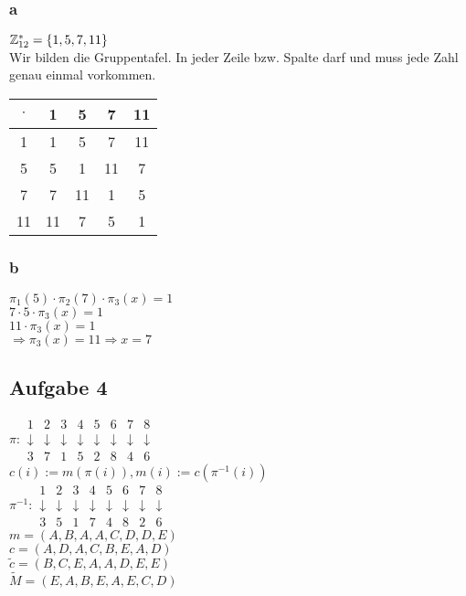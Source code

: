 \subsubsection{a}
$\mathbb{Z}_{12}^* =\{1,5,7,11\}$\\ 
Wir bilden die Gruppentafel. In jeder Zeile bzw. Spalte darf und muss jede Zahl genau einmal vorkommen. 
\begin{tabular}{|c|c|c|c|c|}
\hline $\cdot$ & 1 & 5 & 7 & 11 \\ 
\hline 1 & 1 & 5 & 7 & 11 \\ 
\hline 5 & 5 & 1 & 11 & 7 \\ 
\hline 7 & 7 & 11 & 1 & 5 \\ 
\hline 11 & 11 & 7 & 5 & 1 \\ 
\hline 
\end{tabular} 

\subsubsection{b}
$\pi_1(5)\cdot \pi_2(7)\cdot \pi_3(x) = 1$\\
$7 \cdot  5 \cdot  \pi_3(x)=1$\\
$11 \cdot  \pi_3(x) = 1$\\
$\Rightarrow \pi_3(x)=11 \Rightarrow x=7$

\subsection{Aufgabe 4}
$\pi:
\begin{array}{cccccccc}
1 & 2 & 3 & 4 & 5 & 6 & 7 & 8 \\ 
\downarrow & \downarrow & \downarrow & \downarrow & \downarrow & \downarrow & \downarrow & \downarrow \\ 
3 & 7 & 1 & 5 & 2 & 8 & 4 & 6
\end{array} 
$\\
$c(i):=m(\pi(i)), m(i):=c(\pi^{-1}(i))$\\
$\pi^{-1}:
\begin{array}{cccccccc}
1 & 2 & 3 & 4 & 5 & 6 & 7 & 8 \\ 
\downarrow & \downarrow & \downarrow & \downarrow & \downarrow & \downarrow & \downarrow & \downarrow \\ 
3 & 5 & 1 & 7 & 4 & 8 & 2 & 6
\end{array} 
$\\
$m=(A,B,A,A,C,D,D,E)$\\
$c=(A,D,A,C,B,E,A,D)$\\
$\tilde{c}=(B,C,E,A,A,D,E,E)$\\
$\tilde{M}=(E,A,B,E,A,E,C,D)$\\

